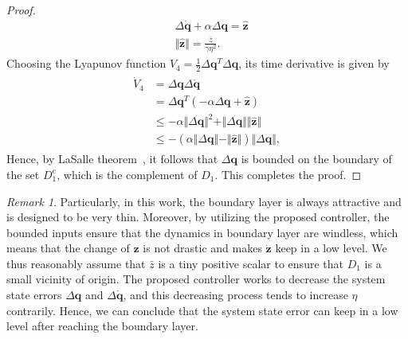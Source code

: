 \documentclass[3p]{elsarticle}
\theoremstyle{plain}
\theoremstyle{remark}
\newtheorem{myrem}{Remark}
\begin{document}
\begin{proof}
\begin{align}
&\Delta \dot {\bm q}+\alpha\Delta\bm q=\hat{\bm z}\\
&\Vert\hat{\bm z}\Vert=\frac{\bar z}{\gamma\eta^2}.
\end{align}
Choosing the Lyapunov function $V_4=\frac{1}{2}\Delta\bm q^T\Delta\bm q$, its time derivative is given by
\begin{align}\begin{split}
\dot V_4 &= \Delta\bm q\Delta\dot{\bm q}\\
&=\Delta\bm q^T(-\alpha\Delta\bm q+\hat{\bm z})\\
&\le-\alpha\Vert\Delta\bm q\Vert^2+\Vert\Delta\bm q\Vert\Vert\hat{\bm z}\Vert\\
&\le-(\alpha\Vert\Delta\bm q\Vert-\Vert\hat{\bm z}\Vert)\Vert\Delta\bm q\Vert,
\end{split}\end{align}
Hence, by LaSalle theorem~\cite{lasalle1960some}, it follows that $\Delta\bm q$ is bounded on the boundary of the set $D_1^c$, which is the complement of $D_1$. This completes the proof.
\end{proof}
\begin{myrem}
Particularly, in this work, the boundary layer is always attractive and is designed to be very thin. Moreover, by utilizing the proposed controller, the bounded inputs ensure that the dynamics in boundary layer are windless, which means that the change of $\bm z$ is not drastic and makes $\dot{\bm z}$ keep in a low level. We thus reasonably assume that $\bar z$ is a tiny positive scalar to ensure that $D_1$ is a small vicinity of origin. The proposed controller works to decrease the system state errors $\Delta\bm q$ and $\Delta\dot{\bm q}$, and this decreasing process tends to increase $\eta$ contrarily. Hence, we can conclude that the system state error can keep in a low level after reaching the boundary layer.
\end{myrem}
\end{document}
